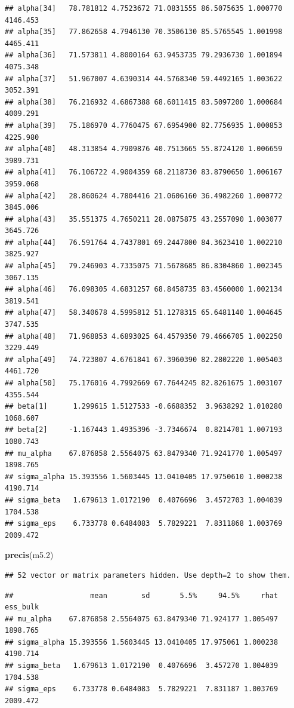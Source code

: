 \documentclass[
]{article}
\newenvironment{Shaded}{\begin{snugshade}}{\end{snugshade}}
\newcommand{\FloatTok}[1]{\textcolor[rgb]{0.00,0.00,0.81}{#1}}
\newcommand{\FunctionTok}[1]{\textcolor[rgb]{0.13,0.29,0.53}{\textbf{#1}}}
\newcommand{\NormalTok}[1]{#1}
\begin{document}
\begin{verbatim}
## alpha[34]   78.781812 4.7523672 71.0831555 86.5075635 1.000770 4146.453
## alpha[35]   77.862658 4.7946130 70.3506130 85.5765545 1.001998 4465.411
## alpha[36]   71.573811 4.8000164 63.9453735 79.2936730 1.001894 4075.348
## alpha[37]   51.967007 4.6390314 44.5768340 59.4492165 1.003622 3052.391
## alpha[38]   76.216932 4.6867388 68.6011415 83.5097200 1.000684 4009.291
## alpha[39]   75.186970 4.7760475 67.6954900 82.7756935 1.000853 4225.980
## alpha[40]   48.313854 4.7909876 40.7513665 55.8724120 1.006659 3989.731
## alpha[41]   76.106722 4.9004359 68.2118730 83.8790650 1.006167 3959.068
## alpha[42]   28.860624 4.7804416 21.0606160 36.4982260 1.000772 3845.006
## alpha[43]   35.551375 4.7650211 28.0875875 43.2557090 1.003077 3645.726
## alpha[44]   76.591764 4.7437801 69.2447800 84.3623410 1.002210 3825.927
## alpha[45]   79.246903 4.7335075 71.5678685 86.8304860 1.002345 3067.135
## alpha[46]   76.098305 4.6831257 68.8458735 83.4560000 1.002134 3819.541
## alpha[47]   58.340678 4.5995812 51.1278315 65.6481140 1.004645 3747.535
## alpha[48]   71.968853 4.6893025 64.4579350 79.4666705 1.002250 3229.449
## alpha[49]   74.723807 4.6761841 67.3960390 82.2802220 1.005403 4461.720
## alpha[50]   75.176016 4.7992669 67.7644245 82.8261675 1.003107 4355.544
## beta[1]      1.299615 1.5127533 -0.6688352  3.9638292 1.010280 1068.607
## beta[2]     -1.167443 1.4935396 -3.7346674  0.8214701 1.007193 1080.743
## mu_alpha    67.876858 2.5564075 63.8479340 71.9241770 1.005497 1898.765
## sigma_alpha 15.393556 1.5603445 13.0410405 17.9750610 1.000238 4190.714
## sigma_beta   1.679613 1.0172190  0.4076696  3.4572703 1.004039 1704.538
## sigma_eps    6.733778 0.6484083  5.7829221  7.8311868 1.003769 2009.472
\end{verbatim}

\begin{Shaded}
\begin{Highlighting}[]
\FunctionTok{precis}\NormalTok{(m5}\FloatTok{.2}\NormalTok{)}
\end{Highlighting}
\end{Shaded}

\begin{verbatim}
## 52 vector or matrix parameters hidden. Use depth=2 to show them.
\end{verbatim}

\begin{verbatim}
##                  mean        sd       5.5%     94.5%     rhat ess_bulk
## mu_alpha    67.876858 2.5564075 63.8479340 71.924177 1.005497 1898.765
## sigma_alpha 15.393556 1.5603445 13.0410405 17.975061 1.000238 4190.714
## sigma_beta   1.679613 1.0172190  0.4076696  3.457270 1.004039 1704.538
## sigma_eps    6.733778 0.6484083  5.7829221  7.831187 1.003769 2009.472
\end{verbatim}
\end{document}
